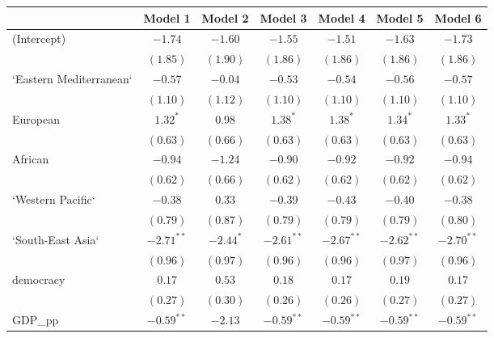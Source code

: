 
\begin{table}[!h]
\begin{center}
\begin{tabular}{l c c c c c c }
\toprule
 & Model 1 & Model 2 & Model 3 & Model 4 & Model 5 & Model 6 \\
\midrule
(Intercept)             & $-1.74$      & $-1.60$      & $-1.55$      & $-1.51$      & $-1.63$      & $-1.73$      \\
                        & $(1.85)$     & $(1.90)$     & $(1.86)$     & $(1.86)$     & $(1.86)$     & $(1.86)$     \\
`Eastern Mediterranean` & $-0.57$      & $-0.04$      & $-0.53$      & $-0.54$      & $-0.56$      & $-0.57$      \\
                        & $(1.10)$     & $(1.12)$     & $(1.10)$     & $(1.10)$     & $(1.10)$     & $(1.10)$     \\
European                & $1.32^{*}$   & $0.98$       & $1.38^{*}$   & $1.38^{*}$   & $1.34^{*}$   & $1.33^{*}$   \\
                        & $(0.63)$     & $(0.66)$     & $(0.63)$     & $(0.63)$     & $(0.63)$     & $(0.63)$     \\
African                 & $-0.94$      & $-1.24$      & $-0.90$      & $-0.92$      & $-0.92$      & $-0.94$      \\
                        & $(0.62)$     & $(0.66)$     & $(0.62)$     & $(0.62)$     & $(0.62)$     & $(0.62)$     \\
`Western Pacific`       & $-0.38$      & $0.33$       & $-0.39$      & $-0.43$      & $-0.40$      & $-0.38$      \\
                        & $(0.79)$     & $(0.87)$     & $(0.79)$     & $(0.79)$     & $(0.79)$     & $(0.80)$     \\
`South-East Asia`       & $-2.71^{**}$ & $-2.44^{*}$  & $-2.61^{**}$ & $-2.67^{**}$ & $-2.62^{**}$ & $-2.70^{**}$ \\
                        & $(0.96)$     & $(0.97)$     & $(0.96)$     & $(0.96)$     & $(0.97)$     & $(0.96)$     \\
democracy               & $0.17$       & $0.53$       & $0.18$       & $0.17$       & $0.19$       & $0.17$       \\
                        & $(0.27)$     & $(0.30)$     & $(0.26)$     & $(0.26)$     & $(0.27)$     & $(0.27)$     \\
GDP\_pp                 & $-0.59^{**}$ & $-2.13$      & $-0.59^{**}$ & $-0.59^{**}$ & $-0.59^{**}$ & $-0.59^{**}$ \\

\end{tabular}
\end{center}
\end{table}
